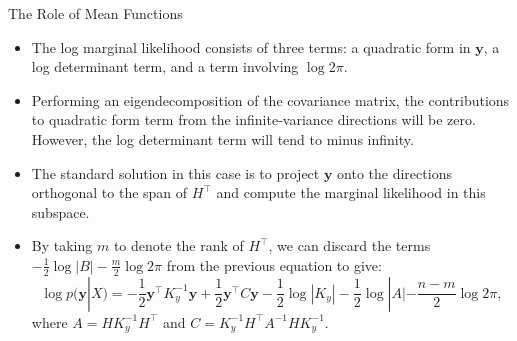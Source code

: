 \begin{frame}[c,allowframebreaks]{The Role of Mean Functions}
\begin{itemize}
\vspace{4mm}
\item[\faLightbulbO] The log marginal likelihood consists of three terms: a quadratic form in $\mathbf{y}$, a log determinant term, and a term involving $\log 2 \pi$.

\end{itemize}

\framebreak
\begin{itemize}

\item Performing an eigendecomposition of the covariance matrix, the contributions to quadratic form term from the infinite-variance directions will be zero. However, the log determinant term will tend to minus infinity. 

\vspace{3mm}
\item The standard solution in this case is to project $\mathbf{y}$ onto the directions orthogonal to the span of $H^\top$ and compute the marginal likelihood in this subspace. 

\vspace{3mm}
\item By taking $m$ to denote the rank of $H^\top$, we can discard the terms $-\frac{1}{2} \log |B|-\frac{m}{2} \log 2 \pi$ from the previous equation to give:
\vspace{-3mm}
$$\log p(\mathbf{y} | X)=-\frac{1}{2} \mathbf{y}^{\top} K_{y}^{-1} \mathbf{y}+\frac{1}{2} \mathbf{y}^{\top} C \mathbf{y}-\frac{1}{2} \log \left|K_{y}\right|-\frac{1}{2} \log |A|-\frac{n-m}{2} \log 2 \pi,$$
where $A=H K_{y}^{-1} H^{\top}$ and $C=K_{y}^{-1} H^{\top} A^{-1} H K_{y}^{-1}$.

\end{itemize}

\framebreak



\framebreak



\framebreak



\framebreak




\end{frame}
